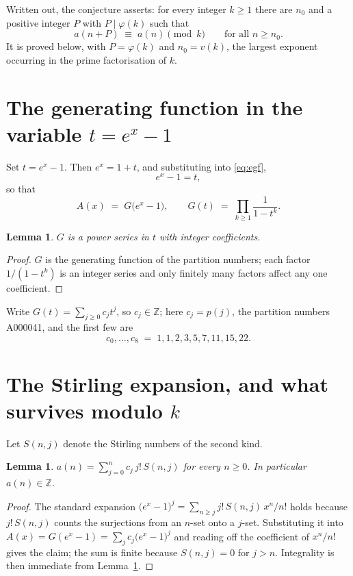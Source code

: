 \documentclass[11pt,a4paper]{article}
\theoremstyle{plain}
\newtheorem{lemma}[theorem]{Lemma}
\theoremstyle{definition}
\begin{document}
Written out, the conjecture asserts: for every integer $k\ge 1$ there are $n_0$ and a
positive integer $P$ with $P\mid\varphi(k)$ such that
\begin{equation}\label{eq:conj}
a(n+P)\;\equiv\;a(n)\pmod{k}\qquad\text{for all } n\ge n_0 .
\end{equation}
It is proved below, with $P=\varphi(k)$ and $n_0=v(k)$, the largest exponent occurring in
the prime factorisation of $k$.

\section{The generating function in the variable $t=e^{x}-1$}

Set $t=e^{x}-1$. Then $e^{x}=1+t$, and substituting into \eqref{eq:egf},
\[
e^{x}-1=t,
\]
so that
\begin{equation}\label{eq:G}
A(x)\;=\;G\bigl(e^{x}-1\bigr),\qquad
G(t)\;=\;\prod_{k\ge 1}\frac{1}{1-t^{k}}.
\end{equation}

\begin{lemma}\label{lem:int}
$G$ is a power series in $t$ with integer coefficients.
\end{lemma}

\begin{proof}
$G$ is the generating function of the partition numbers; each factor $1/(1-t^{k})$ is an integer series and only finitely many factors affect any one coefficient.
\end{proof}

Write $G(t)=\sum_{j\ge0}c_j t^{j}$, so $c_j\in\mathbb{Z}$; here $c_j=p(j)$, the partition numbers A000041, and the
first few are
\[
c_0,\dots,c_8 \;=\; 1, 1, 2, 3, 5, 7, 11, 15, 22.
\]

\section{The Stirling expansion, and what survives modulo $k$}

Let $S(n,j)$ denote the Stirling numbers of the second kind.

\begin{lemma}\label{lem:stir}
$a(n)=\sum_{j=0}^{n} c_j\, j!\, S(n,j)$ for every $n\ge 0$. In particular $a(n)\in\mathbb{Z}$.
\end{lemma}

\begin{proof}
The standard expansion $\bigl(e^{x}-1\bigr)^{j}
=\sum_{n\ge j} j!\,S(n,j)\,x^{n}/n!$ holds because $j!\,S(n,j)$ counts the surjections
from an $n$-set onto a $j$-set. Substituting it into
$A(x)=G(e^{x}-1)=\sum_j c_j\bigl(e^{x}-1\bigr)^{j}$ and reading off the coefficient of
$x^{n}/n!$ gives the claim; the sum is finite because $S(n,j)=0$ for $j>n$. Integrality is
then immediate from Lemma~\ref{lem:int}.
\end{proof}
\end{document}
